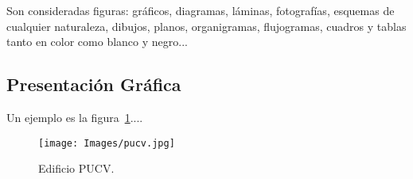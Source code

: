      Son consideradas figuras: gráficos, diagramas, láminas, fotografías,
esquemas de cualquier naturaleza, dibujos, planos, organigramas, flujogramas,
cuadros y tablas tanto en color como blanco y negro...

\subsection{Presentación Gráfica}
       
Un ejemplo es la figura~\ref{fig:pucv}....


\begin{figure}[!htbp]
\begin{center}
\texttt{[image: Images/pucv.jpg]} 
\caption{Edificio PUCV.}\label{fig:pucv}
\end{center}
\end{figure}
